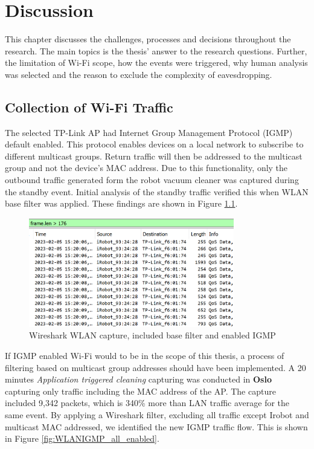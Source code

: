 \chapter{Discussion}
This chapter discusses the challenges, processes and decisions throughout the research. The main topics is the thesis' answer to the research questions. Further, the limitation of Wi-Fi scope, how the events were triggered, why human analysis was selected and the reason to exclude the complexity of eavesdropping. 

\section{Collection of Wi-Fi Traffic}
The selected TP-Link AP had Internet Group Management Protocol (IGMP) \cite{igmp_rfc2236} default enabled. This protocol enables devices on a local network to subscribe to different multicast groups. Return traffic will then be addressed to the multicast group and not the device's MAC address. Due to this functionality, only the outbound traffic generated form the robot vacuum cleaner was captured during the standby event. Initial analysis of the standby traffic verified this when WLAN base filter was applied. These findings are shown in Figure \ref{fig:WLANIGMP_enabled}.

\begin{figure}[H]
    \centering
    \includegraphics[width=0.8\textwidth]{figures/WLAN_IGMP_enabled.png}
    \caption{Wireshark WLAN capture, included base filter and enabled IGMP}
    \label{fig:WLANIGMP_enabled}
\end{figure}

If IGMP enabled Wi-Fi would to be in the scope of this thesis, a process of filtering based on multicast group addresses should have been implemented. A 20 minutes \textit{Application triggered cleaning} capturing was conducted in \textbf{Oslo} capturing only traffic including the MAC address of the AP. The capture included 9,342 packets, which is 340\% more than LAN traffic average for the same event. By applying a Wireshark filter, excluding all traffic except Irobot and multicast MAC addressed, we identified the new IGMP traffic flow. This is shown in Figure \ref{fig:WLANIGMP_all_enabled}. 

